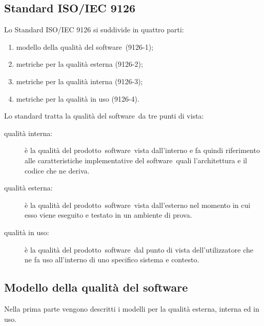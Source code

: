 \documentclass[../PianoDiQualifica.tex]{subfiles}
\begin{document}
\begin{appendices}

\section{Standard ISO/IEC 9126}
	Lo Standard ISO/IEC 9126 si suddivide in quattro parti:
		\begin{enumerate}
			\item modello della qualità del software\g\ (9126-1);
			\item metriche per la qualità esterna (9126-2);
			\item metriche per la qualità interna (9126-3);
			\item metriche per la qualità in uso (9126-4).
		\end{enumerate}
	Lo standard tratta la qualità del software\g\ da tre punti di vista:
	\begin{description}
		\item[qualità interna:] è la qualità del prodotto\g\ software\g\ vista dall'interno e fa quindi riferimento alle caratteristiche implementative del software\g\ quali l'architettura e il codice che ne deriva.
		\item[qualità esterna:] è la qualità del prodotto\g\ software\g\ vista dall'esterno nel momento in cui esso viene eseguito e testato in un ambiente di prova.
		\item[qualità in uso:] è la qualità del prodotto\g\ software\g\ dal punto di vista dell'utilizzatore che ne fa uso all'interno di uno specifico sistema e contesto.
	\end{description}
	
	\subsection{Modello della qualità del software} 
	Nella prima parte vengono descritti i modelli per la qualità esterna, interna ed in uso.

\end{appendices}
\end{document}

